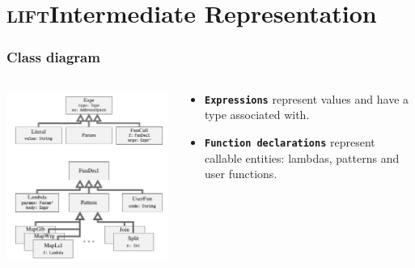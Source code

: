 \documentclass[10pt]{beamer}
\newcommand{\lift}{\textsc{lift}\space}
\newcommand{\code}[1]{\textbf{\texttt{#1}}}
\begin{document}
\section{\lift Intermediate Representation}

\begin{frame}
\frametitle{Class diagram}

    \begin{columns}[onlytextwidth]
\begin{column}{0.65\textwidth}
    \vspace{-.5cm}
    \begin{block}{}
        \begin{center}
            \includegraphics[width=\textwidth]{../images/class_diagram.pdf}
        \end{center}
    \end{block}
\end{column}
\begin{column}{0.35\textwidth}
    \vspace{-.5cm}
\begin{itemize}	
	\item \code{Expressions} represent values and have a type associated with.
\vspace{0.7cm}
	\item \code{Function declarations} represent callable entities: lambdas, patterns and user functions.
\end{itemize}
\end{column}
\end{columns}
\end{frame}
\end{document}
